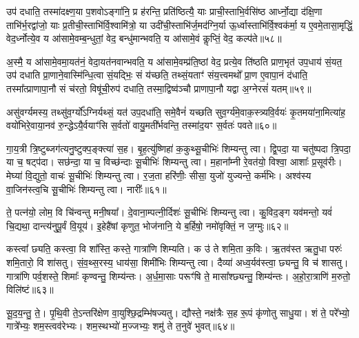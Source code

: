 उप॑ दधाति॒ तस्मा॑दक्ष्ण॒या प॒शवो\-ऽङ्गा॑नि॒ प्र ह॑रन्ति॒ प्रति॑ष्ठित्यै॒ याः प्राची॒स्ताभि॒र्वसि॑ष्ठ आर्ध्नो॒द्या द॑क्षि॒णा ताभि॑र्भ॒रद्वा॑जो॒ याः प्र॒तीची॒स्ताभि॑र्वि॒श्वामि॑त्रो॒ या उदी॑ची॒स्ताभि॑र्ज॒मद॑ग्नि॒र्या ऊ॒र्ध्वास्ताभि॑र्वि॒श्वक॑र्मा॒ य ए॒वमे॒तासा॒मृद्धिं॒ वेद॒र्ध्नोत्ये॒व य आ॑सामे॒वम्ब॒न्धुतां॒ वेद॒ बन्धु॑मान्भवति॒ य आ॑सामे॒वं कॢप्तिं॒ वेद॒ कल्प॑ते॥५८॥

अ॒स्मै॒ य आ॑सामे॒वमा॒यत॑नं॒ वेदा॒यत॑नवान्भवति॒ य आ॑सामे॒वम्प्र॑ति॒ष्ठां वेद॒ प्रत्ये॒व ति॑ष्ठति प्राण॒भृत॑ उप॒धाय॑ सं॒यत॒ उप॑ दधाति प्रा॒णाने॒वास्मि॑न्धि॒त्वा सं॒यद्भिः॒ सं य॑च्छति॒ तथ्सं॒यताꣳ॑ संय॒त्त्वमथो᳚ प्रा॒ण ए॒वापा॒नं द॑धाति॒ तस्मा᳚त्प्राणापा॒नौ सं च॑रतो॒ विषू॑ची॒रुप॑ दधाति॒ तस्मा॒द्विष्व॑ञ्चौ प्राणापा॒नौ यद्वा अ॒ग्नेरसं॑ यतम्॥५९॥

असु॑वर्ग्यमस्य॒ तथ्सु॑व॒र्ग्यो᳚\-ऽग्निर्यथ्सं॒ यत॑ उप॒दधा॑ति॒ समे॒वैनं॑ यच्छति सुव॒र्ग्य॑मे॒वाक॒स्त्र्यवि॒र्वयः॑ कृ॒तमया॑ना॒मित्या॑ह॒ वयो॑भिरे॒वाया॒नव॑ रु॒न्द्धे\-ऽयै॒र्वयाꣳ॑सि स॒र्वतो॑ वायु॒मती᳚र्भवन्ति॒ तस्मा॑द॒यꣳ स॒र्वतः॑ पवते॥६०॥

{\anuvakamend[{प॒श्चादे॒ताः पु॒रो᳚\-ऽक्ष्ण॒या कल्प॒ते\-ऽसं॑ यतं॒ पञ्च॑त्रिꣳशच्च॥10॥}]}

गा॒य॒त्री त्रि॒ष्टुब्जग॑त्यनु॒ष्टुक्प॒ङ्क्त्या॑ स॒ह। बृ॒ह॒त्यु॑ष्णिहा॑ क॒कुथ्सू॒चीभिः॑ शिम्यन्तु त्वा। द्वि॒पदा॒ या चतु॑ष्पदा त्रि॒पदा॒ या च॒ षट्प॑दा। सछ॑न्दा॒ या च॒ विच्छ॑न्दाः सू॒चीभिः॑ शिम्यन्तु त्वा। म॒हाना᳚म्नी रे॒वत॑यो॒ विश्वा॒ आशाः᳚ प्र॒सूव॑रीः। मेघ्या॑ वि॒द्युतो॒ वाचः॑ सू॒चीभिः॑ शिम्यन्तु त्वा। र॒ज॒ता हरि॑णीः॒ सीसा॒ युजो॑ युज्यन्ते॒ कर्म॑भिः। अश्व॑स्य वा॒जिन॑स्त्व॒चि सू॒चीभिः॑ शिम्यन्तु त्वा। नारीः᳚॥६१॥

ते॒ पत्न॑यो॒ लोम॒ वि चि॑न्वन्तु मनी॒षया᳚। दे॒वाना॒म्पत्नी॒र्दिशः॑ सू॒चीभिः॑ शिम्यन्तु त्वा। कु॒विद॒ङ्ग यव॑मन्तो॒ यवं॑ चि॒द्यथा॒ दान्त्य॑नुपू॒र्वं वि॒यूय॑। इ॒हेहै॑षां कृणुत॒ भोज॑नानि॒ ये ब॒र्\mbox{}हिषो॒ नमो॑वृक्तिं॒ न ज॒ग्मुः॥६२॥

{\anuvakamend[{नारी᳚स्त्रि॒ꣳ॒शच्च॑॥11॥}]}

कस्त्वा᳚ छ्यति॒ कस्त्वा॒ वि शा᳚स्ति॒ कस्ते॒ गात्रा॑णि शिम्यति। क उ॑ ते शमि॒ता क॒विः। ऋ॒तव॑स्त ऋतु॒धा परुः॑ शमि॒तारो॒ वि शा॑सतु। सं॒व॒थ्स॒रस्य॒ धाय॑सा॒ शिमी॑भिः शिम्यन्तु त्वा। दैव्या॑ अध्व॒र्यव॑स्त्वा॒ छ्यन्तु॒ वि च॑ शासतु। गात्रा॑णि पर्व॒शस्ते॒ शिमाः᳚ कृण्वन्तु॒ शिम्य॑न्तः। अ॒र्ध॒मा॒साः परूꣳ॑षि ते॒ मासा᳚श्छ्यन्तु॒ शिम्य॑न्तः। अ॒हो॒रा॒त्राणि॑ म॒रुतो॒ विलि॑ष्टं॥६३॥

सू॒द॒य॒न्तु॒ ते॒। पृ॒थि॒वी ते॒\-ऽन्तरि॑क्षेण वा॒युश्छि॒द्रम्भि॑षज्यतु। द्यौस्ते॒ नक्ष॑त्रैः स॒ह रू॒पं कृ॑णोतु साधु॒या। शं ते॒ परे᳚भ्यो॒ गात्रे᳚भ्यः॒ शम॒स्त्वव॑रेभ्यः। शम॒स्थभ्यो॑ म॒ज्जभ्यः॒ शमु॑ ते त॒नुवे॑ भुवत्॥६४॥

